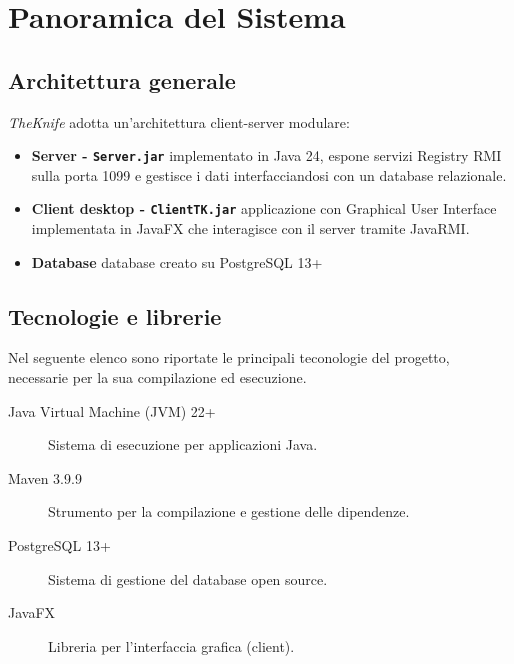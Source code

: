 \section{Panoramica del Sistema}
\label{cap:panoramica}
\subsection{Architettura generale}
\emph{TheKnife} adotta un'architettura client-server modulare:
\begin{itemize}
    \item \textbf{Server - \texttt{Server.jar}} implementato in Java 24, 
    espone servizi Registry RMI sulla porta 1099 e 
    gestisce i dati interfacciandosi con un database relazionale.
    \item \textbf{Client desktop - \texttt{ClientTK.jar}} applicazione con 
    Graphical User Interface implementata in JavaFX 
    che interagisce con il server tramite JavaRMI.
    \item \textbf{Database} database creato su PostgreSQL 13+
\end{itemize}

\subsection{Tecnologie e librerie}
Nel seguente elenco sono riportate le principali teconologie del 
progetto, necessarie per la sua compilazione ed esecuzione.
\begin{description}
    \item[Java Virtual Machine (JVM) 22+] Sistema di esecuzione per applicazioni Java.
    \item[Maven 3.9.9] Strumento per la compilazione e gestione delle dipendenze.
    \item[PostgreSQL 13+] Sistema di gestione del database open source.
    \item[JavaFX] Libreria per l'interfaccia grafica (client).
\end{description}
